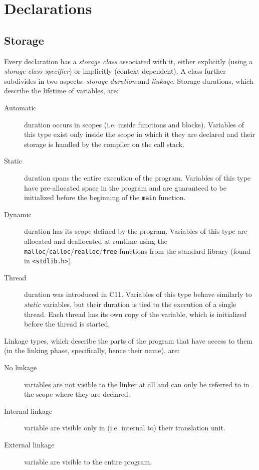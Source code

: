 \section{Declarations}

\subsection{Storage}

\label{subsec:c:storage}

Every declaration has a \textit{storage class} associated with it, either
explicitly (using a \textit{storage class specifier}) or implicitly (context
dependent).  A class further subdivides in two aspects: \textit{storage
duration} and \textit{linkage}.  Storage durations, which describe the lifetime
of variables, are:

\begin{description}
    \item[Automatic]
        duration occurs in scopes (i.e. inside functions and blocks).  Variables
        of this type exist only inside the scope in which it they are declared
        and their storage is handled by the compiler on the call stack.
    \item[Static]
        duration spans the entire execution of the program.  Variables of this
        type have pre-allocated space in the program and are guaranteed to be
        initialized before the beginning of the \texttt{main} function.
    \item[Dynamic]
        duration has its scope defined by the program.  Variables of this type
        are allocated and deallocated at runtime using the
        \texttt{malloc}/\texttt{calloc}/\texttt{realloc}/\texttt{free} functions
        from the standard library (found in \texttt{<stdlib.h>}).
    \item[Thread]
        duration was introduced in C11.  Variables of this type behave similarly
        to \emph{static} variables, but their duration is tied to the execution
        of a single thread.  Each thread has its own copy of the variable, which
        is initialized before the thread is started.
\end{description}

Linkage types, which describe the parts of the program that have access to them
(in the linking phase, specifically, hence their name), are:

\begin{description}
    \item[No linkage]
        variables are not visible to the linker at all and can only be referred
        to in the scope where they are declared.
    \item[Internal linkage]
        variable are visible only in (i.e. internal to) their translation unit.
    \item[External linkage] variable are visible to the entire program.
\end{description}

